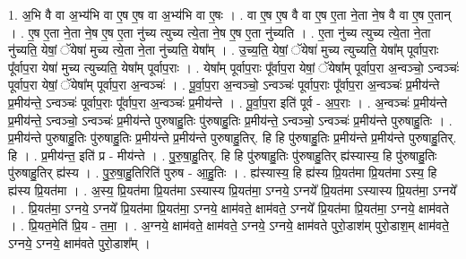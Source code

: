 \documentclass[17pt]{extarticle}
\begin{document}
1. अ॒भि वै वा अ॒भ्य॑भि वा ए॒ष ए॒ष वा अ॒भ्य॑भि वा ए॒षः । . वा ए॒ष ए॒ष वै वा ए॒ष ए॒ता ने॒ता ने॒ष वै वा ए॒ष ए॒तान् । . ए॒ष ए॒ता ने॒ता ने॒ष ए॒ष ए॒ता नु॑च्य त्युच्य त्ये॒ता ने॒ष ए॒ष ए॒ता नु॑च्यति । . ए॒ता नु॑च्य त्युच्य त्ये॒ता ने॒ता नु॑च्यति॒ येषां॒ ॅयेषा॑ मुच्य त्ये॒ता ने॒ता नु॑च्यति॒ येषा᳚म् । . उ॒च्य॒ति॒ येषां॒ ॅयेषा॑ मुच्य त्युच्यति॒ येषा᳚म् पूर्वाप॒राः पू᳚र्वाप॒रा येषा॑ मुच्य त्युच्यति॒ येषा᳚म् पूर्वाप॒राः । . येषा᳚म् पूर्वाप॒राः पू᳚र्वाप॒रा येषां॒ ॅयेषा᳚म् पूर्वाप॒रा अ॒न्वञ्चो॒ ऽन्वञ्चः॑ पूर्वाप॒रा येषां॒ ॅयेषा᳚म् पूर्वाप॒रा अ॒न्वञ्चः॑ । . पू॒र्वा॒प॒रा अ॒न्वञ्चो॒ ऽन्वञ्चः॑ पूर्वाप॒राः पू᳚र्वाप॒रा अ॒न्वञ्चः॑ प्र॒मीय॑न्ते प्र॒मीय॑न्ते॒ ऽन्वञ्चः॑ पूर्वाप॒राः पू᳚र्वाप॒रा अ॒न्वञ्चः॑ प्र॒मीय॑न्ते । . पू॒र्वा॒प॒रा इति॑ पूर्व - अ॒प॒राः । . अ॒न्वञ्चः॑ प्र॒मीय॑न्ते प्र॒मीय॑न्ते॒ ऽन्वञ्चो॒ ऽन्वञ्चः॑ प्र॒मीय॑न्ते पुरुषाहु॒तिः पु॑रुषाहु॒तिः प्र॒मीय॑न्ते॒ ऽन्वञ्चो॒ ऽन्वञ्चः॑ प्र॒मीय॑न्ते पुरुषाहु॒तिः । . प्र॒मीय॑न्ते पुरुषाहु॒तिः पु॑रुषाहु॒तिः प्र॒मीय॑न्ते प्र॒मीय॑न्ते पुरुषाहु॒तिर्. हि हि पु॑रुषाहु॒तिः प्र॒मीय॑न्ते प्र॒मीय॑न्ते पुरुषाहु॒तिर्. हि । . प्र॒मीय॑न्त॒ इति॑ प्र - मीय॑न्ते । . पु॒रु॒षा॒हु॒तिर्. हि हि पु॑रुषाहु॒तिः पु॑रुषाहु॒तिर् ह्य॑स्यास्य॒ हि पु॑रुषाहु॒तिः पु॑रुषाहु॒तिर् ह्य॑स्य । . पु॒रु॒षा॒हु॒तिरिति॑ पुरुष - आ॒हु॒तिः । . ह्य॑स्यास्य॒ हि ह्य॑स्य प्रि॒यत॑मा प्रि॒यत॑मा ऽस्य॒ हि ह्य॑स्य प्रि॒यत॑मा । . अ॒स्य॒ प्रि॒यत॑मा प्रि॒यत॑मा ऽस्यास्य प्रि॒यत॑मा॒ ऽग्नये॒ ऽग्नये᳚ प्रि॒यत॑मा ऽस्यास्य प्रि॒यत॑मा॒ ऽग्नये᳚ । . प्रि॒यत॑मा॒ ऽग्नये॒ ऽग्नये᳚ प्रि॒यत॑मा प्रि॒यत॑मा॒ ऽग्नये॒ क्षाम॑वते॒ क्षाम॑वते॒ ऽग्नये᳚ प्रि॒यत॑मा प्रि॒यत॑मा॒ ऽग्नये॒ क्षाम॑वते । . प्रि॒यत॒मेति॑ प्रि॒य - त॒मा॒ । . अ॒ग्नये॒ क्षाम॑वते॒ क्षाम॑वते॒ ऽग्नये॒ ऽग्नये॒ क्षाम॑वते पुरो॒डाश॑म् पुरो॒डाश॒म् क्षाम॑वते॒ ऽग्नये॒ ऽग्नये॒ क्षाम॑वते पुरो॒डाश᳚म् । \newline
\end{document}
